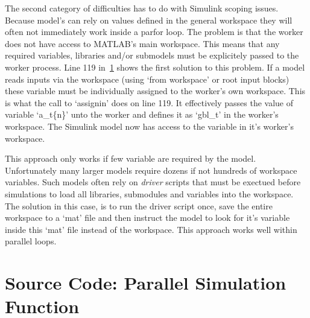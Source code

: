 The second category of difficulties has to do with Simulink scoping issues. Because model's can rely on values defined in the general workspace they will often not immediately work inside a parfor loop. The problem is that the worker does not have access to MATLAB's main workspace. This means that any required variables, libraries and/or submodels must be explicitely passed to the worker process. Line 119 in~\ref{app:parsimcode} shows the first solution to this problem. If a model reads inputs via the workspace (using `from workspace' or root input blocks) these variable must be individually assigned to the worker's own workspace. This is what the call to `assignin' does on line 119. It effectively passes the value of variable `a\_t\{n\}' unto the worker and defines it as `gbl\_t' in the worker's workspace. The Simulink model now has access to the variable in it's worker's workspace.

This approach only works if few variable are required by the model. Unfortunately many larger models require dozens if not hundreds of workspace variables. Such models often rely on \textit{driver} scripts that must be exectued before simulations to load all libraries, submodules and variables into the workspace. The solution in this case, is to run the driver script once, save the entire workspace to a `mat' file and then instruct the model to look for it's variable inside this `mat' file instead of the workspace. This approach works well within parallel loops.

\section{Source Code: Parallel Simulation Function}
\label{app:parsimcode}




